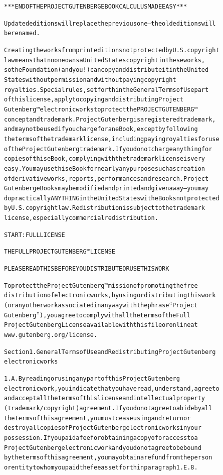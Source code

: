 \documentclass[12pt]{book}[2005/09/16]
\newenvironment{PGtext}{%
\begin{alltt}
\fontsize{9.2}{10.5}\ttfamily\selectfont}%
{\end{alltt}}
\begin{document}
\begin{PGtext}
*** END OF THE PROJECT GUTENBERG EBOOK CALCULUS MADE EASY ***


    

Updated editions will replace the previous one—the old editions will
be renamed.

Creating the works from print editions not protected by U.S. copyright
law means that no one owns a United States copyright in these works,
so the Foundation (and you!) can copy and distribute it in the United
States without permission and without paying copyright
royalties. Special rules, set forth in the General Terms of Use part
of this license, apply to copying and distributing Project
Gutenberg™ electronic works to protect the PROJECT GUTENBERG™
concept and trademark. Project Gutenberg is a registered trademark,
and may not be used if you charge for an eBook, except by following
the terms of the trademark license, including paying royalties for use
of the Project Gutenberg trademark. If you do not charge anything for
copies of this eBook, complying with the trademark license is very
easy. You may use this eBook for nearly any purpose such as creation
of derivative works, reports, performances and research. Project
Gutenberg eBooks may be modified and printed and given away—you may
do practically ANYTHING in the United States with eBooks not protected
by U.S. copyright law. Redistribution is subject to the trademark
license, especially commercial redistribution.


START: FULL LICENSE

THE FULL PROJECT GUTENBERG™ LICENSE

PLEASE READ THIS BEFORE YOU DISTRIBUTE OR USE THIS WORK

To protect the Project Gutenberg™ mission of promoting the free
distribution of electronic works, by using or distributing this work
(or any other work associated in any way with the phrase “Project
Gutenberg”), you agree to comply with all the terms of the Full
Project Gutenberg License available with this file or online at
www.gutenberg.org/license.

Section 1. General Terms of Use and Redistributing Project Gutenberg
electronic works

1.A. By reading or using any part of this Project Gutenberg
electronic work, you indicate that you have read, understand, agree to
and accept all the terms of this license and intellectual property
(trademark/copyright) agreement. If you do not agree to abide by all
the terms of this agreement, you must cease using and return or
destroy all copies of Project Gutenberg electronic works in your
possession. If you paid a fee for obtaining a copy of or access to a
Project Gutenberg electronic work and you do not agree to be bound
by the terms of this agreement, you may obtain a refund from the person
or entity to whom you paid the fee as set forth in paragraph 1.E.8.


\end{PGtext}
\end{document}
